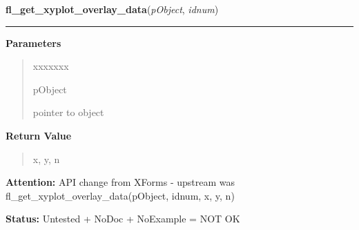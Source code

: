 \hspace{.8\funcindent}\begin{boxedminipage}{\funcwidth}

    \raggedright \textbf{fl\_get\_xyplot\_overlay\_data}(\textit{pObject}, \textit{idnum})

    \vspace{-1.5ex}

    \rule{\textwidth}{0.5\fboxrule}
\setlength{\parskip}{2ex}
\setlength{\parskip}{1ex}
      \textbf{Parameters}
      \vspace{-1ex}

      \begin{quote}
        \begin{Ventry}{xxxxxxx}

          \item[pObject]

          pointer to object

        \end{Ventry}

      \end{quote}

      \textbf{Return Value}
    \vspace{-1ex}

      \begin{quote}
      x, y, n

      \end{quote}

\textbf{Attention:} API change from XForms - upstream was 
fl\_get\_xyplot\_overlay\_data(pObject, idnum, x, y, n)



\textbf{Status:} Untested + NoDoc + NoExample = NOT OK



    \end{boxedminipage}

    \label{xformslib:library:fl_set_xyplot_overlay_type}

    \vspace{0.5ex}

